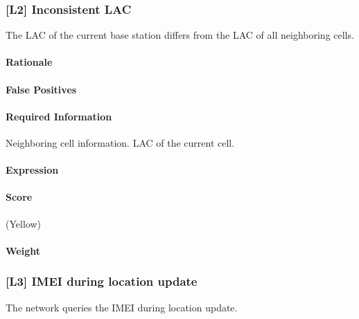 \documentclass[a4paper,11pt,notitlepage,bigheadings,oneside]{scrartcl}
\begin{document}
\TBD{}

\subsubsection{[L2] Inconsistent LAC}

The LAC of the current base station differs from the LAC of all neighboring cells.


\paragraph{Rationale}

\TBD{}

\paragraph{False Positives}

\TBD{}

\paragraph{Required Information}

Neighboring cell information. LAC of the current cell.

\paragraph{Expression}

\TBD{}

\paragraph{Score}

\TBD{} (Yellow)

\paragraph{Weight}

\TBD{}

\subsubsection{[L3] IMEI during location update}

The network queries the IMEI during location update.
\end{document}
